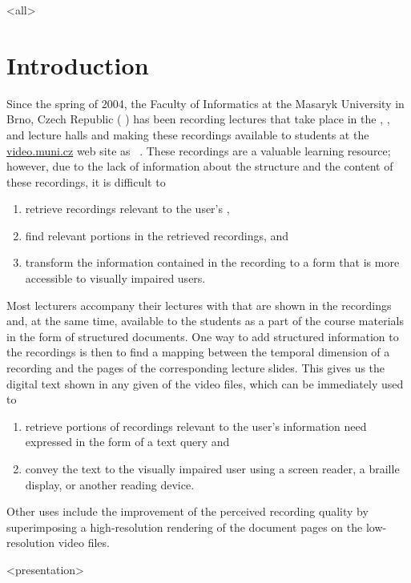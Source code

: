 \mode
<all>{%
\section{Introduction}}
Since the spring of 2004, the Faculty of Informatics at the Masaryk University
in Brno, Czech Republic ( ) has been recording lectures that
take place in the , , and  lecture halls and making
these recordings available to students at the
\href{https://www.video.muni.cz}{video.muni.cz} web site as ~\cite{hladkaliska03lectures}. These recordings are a valuable learning
resource; however, due to the lack of information about the structure and the
content of these recordings, it is difficult to
\begin{enumerate}
\item retrieve recordings relevant to the user's ,
\item find relevant portions in the retrieved recordings, and
\item transform the information contained in the recording to a form that is more
  accessible to visually impaired users.
\end{enumerate}

Most lecturers accompany their lectures with  that are shown
in the recordings and, at the same time, available to the students as a part of
the course materials in the form of structured  documents. One way to
add structured information to the recordings is then to find a mapping between the
temporal dimension of a recording and the pages of the corresponding lecture
slides. This gives us the digital text shown in any given  of the
video files, which can be immediately used to
\begin{enumerate}
\item retrieve portions of recordings relevant to the user's information need
  expressed in the form of a text query and
\item convey the text to the visually impaired user using a screen reader, a
  braille display, or another reading device.
\end{enumerate}
Other uses include the improvement of the perceived recording quality by
superimposing a high-resolution rendering of the  document pages on
the low-resolution video files.

\mode
<presentation>


